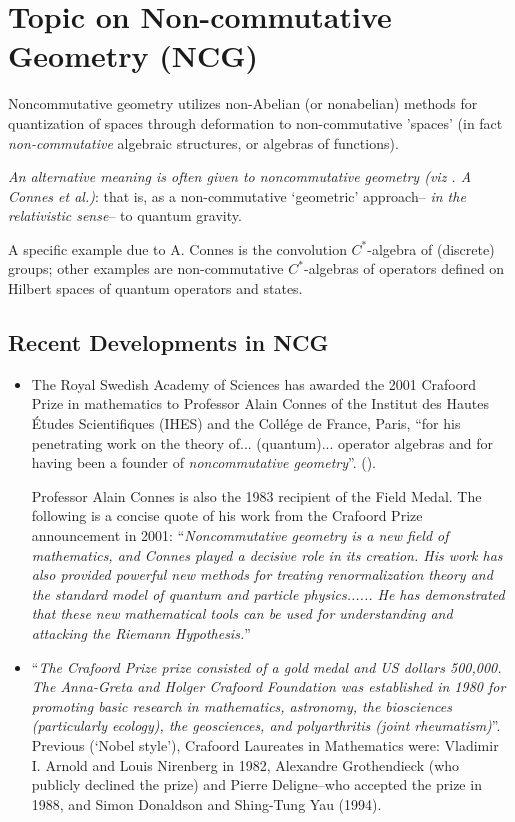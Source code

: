 \documentclass[12pt]{article}
\begin{document}
\section{Topic on Non-commutative Geometry (NCG)} 

 Noncommutative geometry utilizes non-Abelian (or nonabelian) methods for quantization of spaces through deformation to non-commutative 'spaces' (in fact {\em non-commutative} algebraic structures, or algebras of functions). 

 \emph{An alternative meaning is often given to noncommutative geometry (viz . A Connes et al.)}:  
that is, as a non-commutative `geometric' approach-- \emph{in the relativistic sense}-- to quantum gravity.

 A specific example due to A. Connes is the convolution $C^*$-algebra of (discrete) groups;
other examples are non-commutative $C^*$-algebras of operators defined on Hilbert spaces of
quantum operators and states. 

\subsection{Recent Developments in NCG} 
\begin{itemize}
\item The Royal Swedish Academy of Sciences has awarded the 2001 Crafoord Prize in mathematics
to Professor Alain Connes of the Institut des Hautes \'Etudes Scientifiques (IHES) and the
Coll\'ege de France, Paris, ``for his penetrating work on the theory of... (quantum)... operator algebras
and for having been a founder of \emph{noncommutative geometry}''.
().

Professor Alain Connes is also the 1983 recipient of the Field Medal. The following is a concise quote of his work
from the Crafoord Prize announcement in 2001: ``{\em Noncommutative geometry is a new field of mathematics, and
Connes played a decisive role in its creation. His work has also provided powerful new methods for treating renormalization theory and the standard model of quantum and particle physics...... 
He has demonstrated that these new mathematical tools can be used for understanding and attacking the Riemann Hypothesis.}''

\item ``\emph{The Crafoord Prize prize consisted of a gold medal and US dollars 500,000. The Anna-Greta and Holger Crafoord Foundation was established in 1980 for promoting basic research in mathematics, astronomy, the biosciences
(particularly ecology), the geosciences, and polyarthritis (joint rheumatism)}''. Previous (`Nobel style'), Crafoord
Laureates in Mathematics were: Vladimir I. Arnold and Louis Nirenberg in 1982, Alexandre Grothendieck (who publicly declined the prize) and Pierre Deligne--who accepted the prize in 1988, and Simon Donaldson and Shing-Tung Yau (1994).
\end{itemize}


\end{document}
